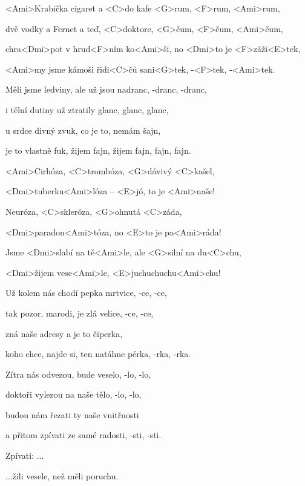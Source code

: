 

\zs
<Ami>Krabička cigaret a <C>do kafe <G>rum, <F>rum, <Ami>rum,

dvě vodky a Fernet a teď, <C>doktore, <G>čum, <F>čum, <Ami>čum,

chra<Dmi>pot v hrud<F>ním ko<Ami>ši, no <Dmi>to je <F>záži<E>tek,

<Ami>my jsme kámoši řidi<C>čů sani<G>tek, -<F>tek, -<Ami>tek.
\ks

\zs
Měli jsme ledviny, ale už jsou nadranc, -dranc, -dranc,

i tělní dutiny už ztratily glanc, glanc, glanc,

u srdce divný zvuk, co je to, nemám šajn,

je to vlastně fuk, žijem fajn, žijem fajn, fajn, fajn.
\ks

\zr
<Ami>Cirhóza, <C>trombóza, <G>dávivý <C>kašel,

<Dmi>tuberku<Ami>lóza -- <E>jó, to je <Ami>naše!

Neuróza, <C>skleróza, <G>ohnutá <C>záda,

<Dmi>paradon<Ami>tóza, no <E>to je pa<Ami>ráda!

Jsme <Dmi>slabí na tě<Ami>le, ale <G>silní na du<C>chu,

<Dmi>žijem vese<Ami>le, <E>juchuchuchu<Ami>chu!
\kr

\zs
Už kolem nás chodí pepka mrtvice, -ce, -ce,

tak pozor, marodi, je zlá velice, -ce, -ce,

zná naše adresy a je to čiperka,

koho chce, najde si, ten natáhne pérka, -rka, -rka.
\ks

\zs
Zítra nás odvezou, bude veselo, -lo, -lo,

doktoři vylezou na naše tělo, -lo, -lo,

budou nám řezati ty naše vnitřnosti

a přitom zpívati ze samé radosti, -sti, -sti.
\ks

\zr
Zpívati: ...

...žili vesele, než měli poruchu.
\kr


\kp
